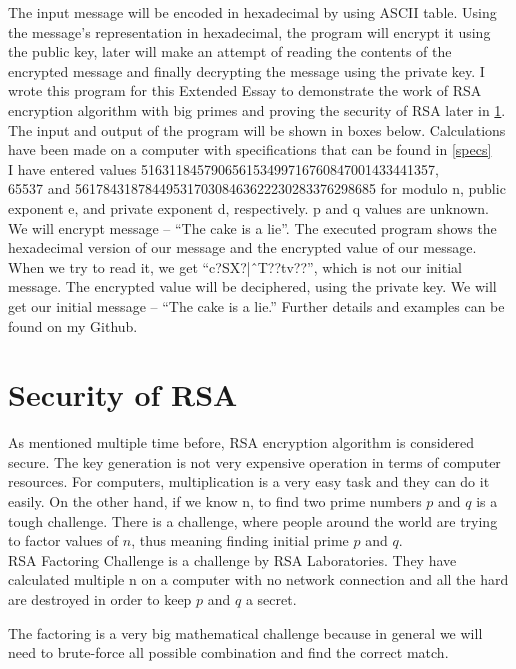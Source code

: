 \documentclass[a4paper, 12pt]{article}
\begin{document}
The input message will be encoded in hexadecimal by using ASCII table. Using
the message’s representation in hexadecimal, the program will encrypt it using the public key, later
will make an attempt of reading the contents of the encrypted message and finally decrypting the
message using the private key. I wrote this program for this Extended Essay to demonstrate the
work of RSA encryption algorithm with big primes and proving the security of RSA later in \ref{sec:security}.
The input and output of the program will be shown in boxes below. Calculations have been
made on a computer with specifications that can be found in \ref{specs}\\

I have entered values 516311845790656153499716760847001433441357,\\ 65537 and
5617843187844953170308463622230283376298685 for modulo n, public exponent e, and private
exponent d, respectively. p and q values are unknown. We will encrypt message – “The cake is a
lie”. The executed program shows the hexadecimal version of our message and the encrypted
value of our message. When we try to read it, we get “c?SX?|ˆT??tv??”, which is not our
initial message. The encrypted value will be deciphered, using the private key. We will get our
initial message – “The cake is a lie.” Further details and examples can be found on my Github\cite{github}.\\

\section{Security of RSA}
\label{sec:security}

As mentioned multiple time before, RSA encryption algorithm is considered secure. The key
generation is not very expensive operation in terms of computer resources. For computers,
multiplication is a very easy task and they can do it easily. On the other hand, if we know n, to
find two prime numbers $p$ and $q$ is a tough challenge. There is a challenge, where people around
the world are trying to factor values of $n$, thus meaning finding initial prime $p$ and $q$.\cite{rsa}\\

RSA Factoring Challenge is a challenge by RSA Laboratories. They have calculated multiple n on
a computer with no network connection and all the hard are destroyed in order to keep $p$ and $q$ a
secret.

The factoring is a very big mathematical challenge because in general we will need to brute-force
all possible combination and find the correct match.
\end{document}
